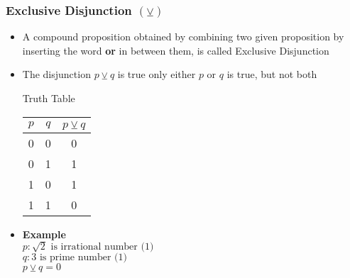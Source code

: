 \documentclass{article}
\begin{document}
	\subsubsection{Exclusive Disjunction $(\veebar)$}
	\begin{itemize}
		\item A compound proposition obtained by combining two given proposition by inserting the word
			\textbf{or} in between them, is called Exclusive Disjunction
		\item The disjunction $p\veebar q$ is true only either $p$ or $q$ is true, but not both
			\begin{center}
				Truth Table \\ \vspace{1em}
				\begin{tabular}{|c|c|c|} \hline
					$p$ &  $q$ & $p\veebar q$ \\ \hline
					0 & 0 & 0 \\
					0 & 1 & 1 \\
					1 & 0 & 1 \\
					1 & 1 & 0 \\ \hline
				\end{tabular}
			\end{center}
		\item [] \textbf{Example} \\
			$p : \sqrt{2}\text{ is irrational number (1)}$ \\
			$q : 3\text{ is prime number (1)}$ \\
			$p\veebar q=0$
	\end{itemize}
\end{document}
